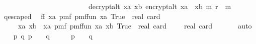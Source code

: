 \begin{isabellebody}
\ \ \ \ \ \ \ \ \ \ \ \ \ \ \ \ \ \ \ \ \ \ \ \ \ decrypt{\isacharunderscore}{\kern0pt}alt\ xa\ xb\ {\isacharparenleft}{\kern0pt}encrypt{\isacharunderscore}{\kern0pt}alt\ {\isacharparenleft}{\kern0pt}xa\ {\isacharasterisk}{\kern0pt}\ xb{\isacharparenright}{\kern0pt}\ m\ r{\isacharparenright}{\kern0pt}\ {\isacharequal}{\kern0pt}\ m{\isacharparenright}{\kern0pt}{\isacharparenright}{\kern0pt}{\isacharparenright}{\kern0pt}{\isachardoublequoteclose}\isanewline
\isanewline
\ \ \isamarkupfalse%
\ q{\isacharunderscore}{\kern0pt}escaped\ \isamarkupfalse%
\ ff{\isacharcolon}{\kern0pt}\ {\isachardoublequoteopen}{\isacharparenleft}{\kern0pt}{\isasymSum}xa{\isasymin}{\isacharquery}{\kern0pt}{\isasymK}{\isachardot}{\kern0pt}\ pmf\ {\isacharparenleft}{\kern0pt}{\isacharquery}{\kern0pt}pmf{\isacharunderscore}{\kern0pt}fun{\isacharprime}{\kern0pt}\ xa{\isacharparenright}{\kern0pt}\ True{\isacharparenright}{\kern0pt}\ {\isacharslash}{\kern0pt}\ real\ {\isacharparenleft}{\kern0pt}card\ {\isacharquery}{\kern0pt}{\isasymK}{\isacharparenright}{\kern0pt}\ {\isacharequal}{\kern0pt}\ \isanewline
\ \ \ \ \ {\isacharparenleft}{\kern0pt}{\isasymSum}xa{\isasymin}{\isacharquery}{\kern0pt}{\isasymK}{\isachardot}{\kern0pt}\ {\isacharparenleft}{\kern0pt}{\isasymSum}xb{\isasymin}{\isacharparenleft}{\kern0pt}{\isacharquery}{\kern0pt}{\isasymK}\ {\isacharminus}{\kern0pt}\ {\isacharbraceleft}{\kern0pt}xa{\isacharbraceright}{\kern0pt}{\isacharparenright}{\kern0pt}{\isachardot}{\kern0pt}\ pmf\ {\isacharparenleft}{\kern0pt}{\isacharparenleft}{\kern0pt}{\isacharquery}{\kern0pt}pmf{\isacharunderscore}{\kern0pt}fun{\isacharprime}{\kern0pt}{\isacharprime}{\kern0pt}{\isacharprime}{\kern0pt}\ xa{\isacharparenright}{\kern0pt}\ xb{\isacharparenright}{\kern0pt}\ True{\isacharparenright}{\kern0pt}{\isacharparenright}{\kern0pt}\ {\isacharslash}{\kern0pt}\ {\isacharparenleft}{\kern0pt}real\ {\isacharparenleft}{\kern0pt}card\ {\isacharquery}{\kern0pt}{\isasymK}\ {\isacharminus}{\kern0pt}\ {}{\isacharparenright}{\kern0pt}\ {\isacharasterisk}{\kern0pt}\ real\ {\isacharparenleft}{\kern0pt}card\ {\isacharquery}{\kern0pt}{\isasymK}{\isacharparenright}{\kern0pt}{\isacharparenright}{\kern0pt}{\isachardoublequoteclose}\isanewline
\ \ \ \ \isamarkupfalse%
\ auto\isanewline
\isanewline
\ \ \isamarkupfalse%
\ {\isachardoublequoteopen}{\isasymAnd}p\ q{\isachardot}{\kern0pt}\ {\isacharparenleft}{\kern0pt}p\ {\isasymin}\ {\isacharquery}{\kern0pt}{\isasymK}\ {\isasymand}\ q\ {\isasymin}\ {\isacharquery}{\kern0pt}{\isasymK}{\isacharparenright}{\kern0pt}\ {\isasymlongrightarrow}\ {}\ {\isasymle}\ p\ {\isasymand}\ {}\ {\isasymle}\ q{\isachardoublequoteclose}\ \isanewline

\end{isabellebody}
